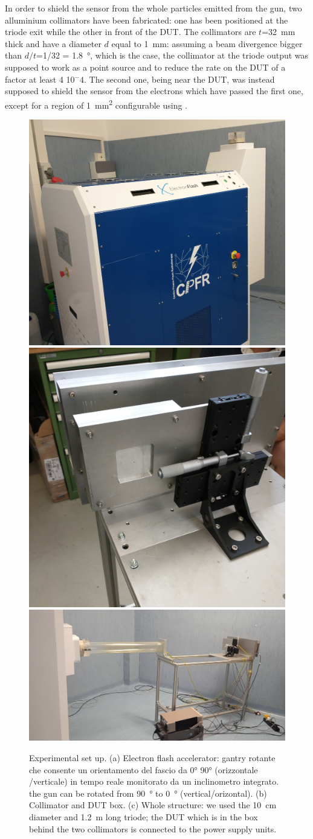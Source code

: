       In order to shield the sensor from the whole particles emitted from the gun, two alluminium collimators have been fabricated: one has been positioned at the triode exit while the other in front of the DUT. The collimators are $t$=\SI{32}{mm} thick and have a diameter $d$ equal to \SI{1}{mm}: assuming a beam divergence bigger than $d/t$=1/32 = \SI{1.8}{\degree}, which is the case, the collimator at the triode output was supposed to work as a point source and to reduce the rate on the DUT of a factor at least 4 10${^-4}$. The second one, being near the DUT, was instead supposed to shield the sensor from the electrons which have passed the first one, except for a region of \SI{1}{mm\squared} configurable using .  
      \begin{figure}[h!]
         \centering
         \includegraphics[width=.40\linewidth]{figures/test_beam/electron_flash.jpg}
         \includegraphics[width=.35\linewidth]{figures/test_beam/collimator_box.jpg}\\     
         \includegraphics[width=.77\linewidth]{figures/test_beam/carrello.jpeg} 
         \label{fig:set_up}
         \caption{Experimental set up. (a) Electron flash accelerator: 
         gantry rotante che consente un orientamento del fascio da 0°
90° (orizzontale /verticale) in tempo reale monitorato da un inclinometro integrato.
         the gun can be rotated from \SI{90}{\degree} to \SI{0}{\degree} (vertical/orizontal). (b) Collimator and DUT box. (c) Whole structure: we used the \SI{10}{cm} diameter and \SI{1.2}{m} long triode; the DUT which is in the box behind the two collimators is connected to the power supply units.}
      \end{figure}  

